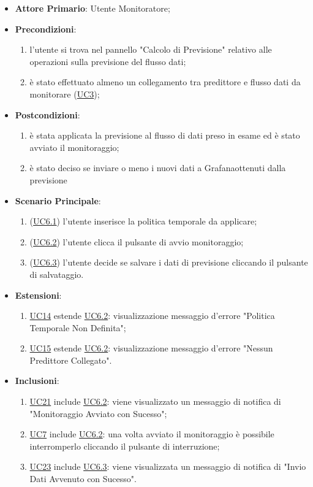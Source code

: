 		\begin{itemize}
			\item\textbf{Attore Primario}: Utente Monitoratore;
			\item\textbf{Precondizioni}: 
				\begin{enumerate}
					\item l'utente si trova nel pannello "Calcolo di Previsione" relativo alle operazioni sulla previsione del flusso dati;
					\item è stato effettuato almeno un collegamento tra predittore e flusso dati da monitorare (\hyperref[par:UC3]{UC3});
				\end{enumerate}		
	\item\textbf{Postcondizioni}: 
				\begin{enumerate}
					\item è stata applicata la previsione al flusso di dati preso in esame ed è stato avviato il monitoraggio; 
					\item è stato deciso se inviare o meno i nuovi dati a Grafanaottenuti dalla previsione
				\end{enumerate}
			\item\textbf{Scenario Principale}: 
				\begin{enumerate} 
					\item (\hyperref[par:UC6.1]{UC6.1}) l'utente inserisce la politica temporale da applicare;
					\item (\hyperref[par:UC6.2]{UC6.2}) l'utente clicca il pulsante di avvio monitoraggio; 
					\item (\hyperref[par:UC6.3]{UC6.3}) l'utente decide se salvare i dati di previsione cliccando il pulsante di salvataggio.
				\end{enumerate}
			\item\textbf{Estensioni}: 
				\begin{enumerate} 
					\item \hyperref[par:UC14]{UC14} estende \hyperref[par:UC6.2]{UC6.2}: visualizzazione messaggio d’errore "Politica Temporale Non Definita";
					\item \hyperref[par:UC15]{UC15} estende \hyperref[par:UC6.2]{UC6.2}: visualizzazione messaggio d’errore "Nessun Predittore Collegato".
				\end{enumerate}
			\item\textbf{Inclusioni}: 
				\begin{enumerate} 
					\item \hyperref[par:UC21]{UC21} include \hyperref[par:UC6.2]{UC6.2}: viene visualizzato un messaggio di notifica di "Monitoraggio Avviato con Sucesso";
					\item \hyperref[par:UC7]{UC7}  include \hyperref[par:UC6.2]{UC6.2}: una volta avviato il monitoraggio è possibile interromperlo cliccando il pulsante di interruzione;
					\item \hyperref[par:UC23]{UC23} include \hyperref[par:UC6.3]{UC6.3}: viene visualizzata un messaggio di notifica di "Invio Dati Avvenuto con Sucesso".
				\end{enumerate}				
		\end{itemize}

